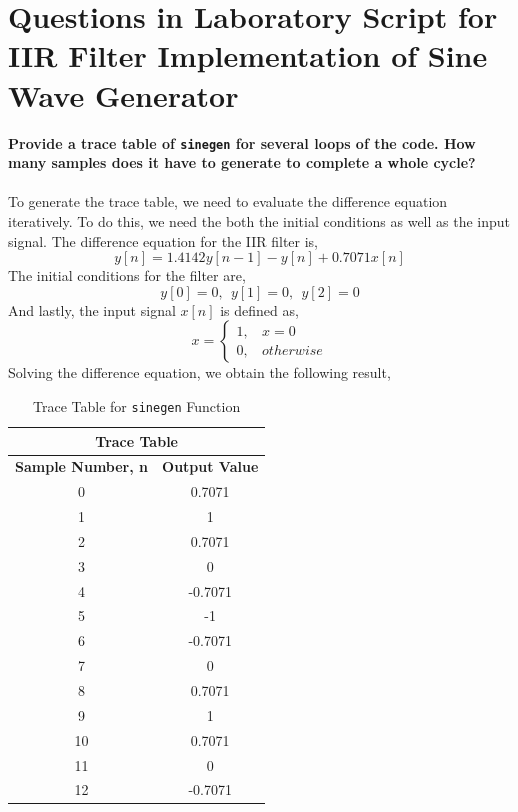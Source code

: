 \documentclass{article}
\begin{document}
\section{Questions in Laboratory Script for IIR Filter Implementation of Sine Wave Generator}
\textbf{Provide a trace table of {\tt sinegen} for several loops of the code. How many samples does it have to generate to complete a whole cycle?}\\\\
To generate the trace table, we need to evaluate the difference equation iteratively. To do this, we need the both the initial conditions as well as the input signal. The difference equation for the IIR filter is,
\begin{equation}
    y[n] = 1.4142y[n-1] - y[n] + 0.7071x[n]
\end{equation}
The initial conditions for the filter are,\\
\begin{equation}
    y[0] = 0,\ \ y[1] = 0,\ \ y[2] = 0
\end{equation}
And lastly, the input signal $x[n]$ is defined as,
\begin{equation}
    x = \begin{cases}
    1, \ \ \ \ x=0 \\
    0, \ \ \ \ otherwise  
  \end{cases} 
\end{equation}
Solving the difference equation, we obtain the following result,
\begin{table}[h]
\centering
\begin{tabular}{|c|c|}
\hline
\multicolumn{2}{|c|}{\textbf{Trace Table}}        \\ \hline
\textbf{Sample Number, n} & \textbf{Output Value} \\ \hline
0                         & 0.7071                \\ \hline
1                         & 1                     \\ \hline
2                         & 0.7071                \\ \hline
3                         & 0                     \\ \hline
4                         & -0.7071               \\ \hline
5                         & -1                    \\ \hline
6                         & -0.7071               \\ \hline
7                         & 0                     \\ \hline
8                         & 0.7071                \\ \hline
9                         & 1                     \\ \hline
10                        & 0.7071                \\ \hline
11                        & 0                     \\ \hline
12                        & -0.7071               \\ \hline
\end{tabular}
\caption{Trace Table for {\tt sinegen} Function}
\end{table}
\end{document}
